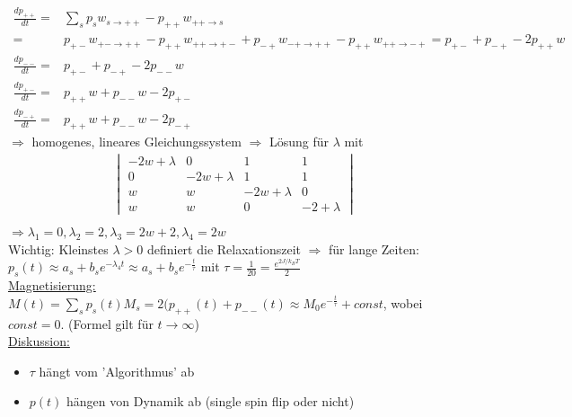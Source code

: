 \documentclass[12pt]{article}
\begin{document}
  \begin{align*}
 \frac{dp_{++}}{dt} =& \sum_s p_s w_{s \rightarrow ++} - p_{++} w_{++ \rightarrow s} \\
 =& p_{+-} w_{+- \rightarrow ++} - p_{++} w_{++ \rightarrow +-} +
 p_{-+} w_{-+ \rightarrow ++} - p_{++} w_{++ \rightarrow -+} =
 p_{+-} + p_{-+} - 2 p_{++} w \\
 \frac{dp_{--}}{dt}= & p_{+-} + p_{-+} - 2p_{--}w \\
  \frac{dp_{+-}}{dt}= & p_{++}w + p_{--} w- 2p_{+-} \\
   \frac{dp_{-+}}{dt}= & p_{++}w + p_{--}w -2p_{-+}
 \end{align*}
$\Rightarrow$ homogenes, lineares Gleichungssystem
$\Rightarrow$ Lösung für $\lambda$ mit 
\begin{align*}
\begin{vmatrix}
-2w+\lambda & 0 & 1 & 1 \\
0 & -2w +\lambda & 1 & 1 \\
w & w & -2w + \lambda & 0 \\
w & w & 0 & -2+\lambda 
\end{vmatrix} \\
\end{align*}
$\Rightarrow \lambda_1=0, \lambda_2=2, \lambda_3=2w+2, \lambda_4=2w$ \\
Wichtig: Kleinstes $\lambda >0$ definiert die Relaxationszeit
$\Rightarrow$ für lange Zeiten: $p_s(t) \approx a_s + b_s e^{-\lambda_4 t} \approx a_s + b_s e^{-\frac{t}{\tau}}$ mit $\tau= \frac{1}{20}= \frac{e^{2J/k_BT}}{2}$ \\
\underline{Magnetisierung:} $M(t)= \sum_s p_s(t) M_s = 2(p_{++}(t) + p_{--}(t) \approx M_0 e^{-\frac{t}{\tau}} + const$, wobei $const=0$. (Formel gilt für $t\to \infty$) \\
\underline{Diskussion:} %
\begin{itemize}
\item $\tau$ hängt vom 'Algorithmus' ab
\item $p(t)$ hängen von Dynamik ab (single spin flip oder nicht)
\end{itemize}
\end{document}

